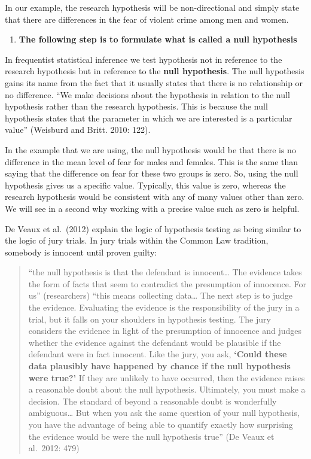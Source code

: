 \documentclass[
]{book}
\providecommand{\tightlist}{%
  \setlength{\itemsep}{0pt}\setlength{\parskip}{0pt}}
\begin{document}
In our example, the research hypothesis will be non-directional and simply state that there are differences in the fear of violent crime among men and women.

\begin{enumerate}
\def\labelenumi{\arabic{enumi}.}
\setcounter{enumi}{2}
\tightlist
\item
  \textbf{The following step is to formulate what is called a null hypothesis}
\end{enumerate}

In frequentist statistical inference we test hypothesis not in reference to the research hypothesis but in reference to the \textbf{null hypothesis}. The null hypothesis gains its name from the fact that it usually states that there is no relationship or no difference. ``We make decisions about the hypothesis in relation to the null hypothesis rather than the research hypothesis. This is because the null hypothesis states that the parameter in which we are interested is a particular value'' (Weisburd and Britt. 2010: 122).

In the example that we are using, the null hypothesis would be that there is no difference in the mean level of fear for males and females. This is the same than saying that the difference on fear for these two groups is zero. So, using the null hypothesis gives us a specific value. Typically, this value is zero, whereas the research hypothesis would be consistent with any of many values other than zero. We will see in a second why working with a precise value such as zero is helpful.

De Veaux et al.~(2012) explain the logic of hypothesis testing as being similar to the logic of jury trials. In jury trials within the Common Law tradition, somebody is innocent until proven guilty:

\begin{quote}
``the null hypothesis is that the defendant is innocent\ldots{} The evidence takes the form of facts that seem to contradict the presumption of innocence. For us'' (researchers) ``this means collecting data\ldots{} The next step is to judge the evidence. Evaluating the evidence is the responsibility of the jury in a trial, but it falls on your shoulders in hypothesis testing. The jury considers the evidence in light of the presumption of innocence and judges whether the evidence against the defendant would be plausible if the defendant were in fact innocent. Like the jury, you ask, \textbf{`Could these data plausibly have happened by chance if the null hypothesis were true?'} If they are unlikely to have occurred, then the evidence raises a reasonable doubt about the null hypothesis. Ultimately, you must make a decision. The standard of beyond a reasonable doubt is wonderfully ambiguous\ldots{} But when you ask the same question of your null hypothesis, you have the advantage of being able to quantify exactly how surprising the evidence would be were the null hypothesis true'' (De Veaux et al.~2012: 479)
\end{quote}
\end{document}
